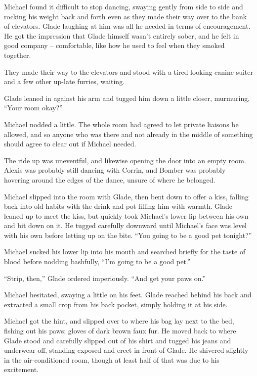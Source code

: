 Michael found it difficult to stop dancing, swaying gently from side to side and rocking his weight back and forth even as they made their way over to the bank of elevators.  Glade laughing at him was all he needed in terms of encouragement.  He got the impression that Glade himself wasn't entirely sober, and he felt in good company -- comfortable, like how he used to feel when they smoked together.

They made their way to the elevators and stood with a tired looking canine suiter and a few other up-late furries, waiting.

Glade leaned in against his arm and tugged him down a little closer, murmuring, ``Your room okay?''

Michael nodded a little.  The whole room had agreed to let private liaisons be allowed, and so anyone who was there and not already in the middle of something should agree to clear out if Michael needed.

The ride up was uneventful, and likewise opening the door into an empty room.  Alexis was probably still dancing with Corrin, and Bomber was probably hovering around the edges of the dance, unsure of where he belonged.

Michael slipped into the room with Glade, then bent down to offer a kiss, falling back into old habits with the drink and pot filling him with warmth.  Glade leaned up to meet the kiss, but quickly took Michael's lower lip between his own and bit down on it.  He tugged carefully downward until Michael's face was level with his own before letting up on the bite.  ``You going to be a good pet tonight?''

Michael sucked his lower lip into his mouth and searched briefly for the taste of blood before nodding bashfully, ``I'm going to be a good pet.''

``Strip, then,'' Glade ordered imperiously.  ``And get your paws on.''

Michael hesitated, swaying a little on his feet.  Glade reached behind his back and extracted a small crop from his back pocket, simply holding it at his side.

Michael got the hint, and slipped over to where his bag lay next to the bed, fishing out his paws: gloves of dark brown faux fur.  He moved back to where Glade stood and carefully slipped out of his shirt and tugged his jeans and underwear off, standing exposed and erect in front of Glade. He shivered slightly in the air-conditioned room, though at least half of that was due to his excitement.

